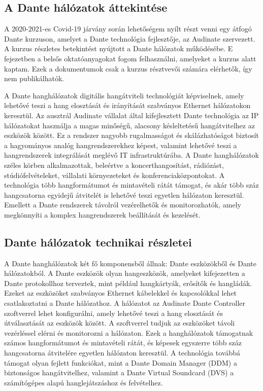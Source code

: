 \subsection{A Dante hálózatok áttekintése}

A 2020-2021-es Covid-19 járvány során lehetőségem nyílt részt venni egy átfogó Dante
kurzuson, amelyet a Dante technológia fejlesztője, az Audinate szervezett. A kurzus
részletes betekintést nyújtott a Dante hálózatok működésébe. E fejezetben a belsős
oktatóanyagokat fogom felhasználni, amelyeket a kurzus alatt kaptam. Ezek a dokumentumok
csak a kurzus résztvevői számára elérhetők, így nem publikálhatók.

A Dante hanghálózatok digitális hangátviteli technológiát képviselnek, amely lehetővé teszi
a hang elosztását és irányítását szabványos Ethernet hálózatokon keresztül. Az ausztrál
Audinate vállalat által kifejlesztett Dante technológia az IP hálózatokat használja a
magas minőségű, alacsony késleltetésű hangátvitelhez az eszközök között. Ez a rendszer
nagyobb rugalmasságot és skálázhatóságot biztosít a hagyományos analóg hangrendszerekhez
képest, valamint lehetővé teszi a hangrendszerek integrálását meglévő IT infrastruktúrába.
A Dante hanghálózatok széles körben alkalmazottak, beleértve a koncerthangosítást, rádiózást,
stúdiófelvételeket, vállalati környezeteket és konferenciaközpontokat. A technológia
több hangformátumot és mintavételi rátát támogat, és akár több száz hangcsatorna egyidejű
átvitelét is lehetővé teszi egyetlen hálózaton keresztül. Emellett a Dante rendszerek távolról
vezérelhetők és monitorozhatók, amely megkönnyíti a komplex hangrendszerek beállítását és
kezelését.


\subsection{Dante hálózatok technikai részletei}
A Dante hanghálózatok két fő komponensből állnak: Dante eszközökből
és Dante hálózatokból. A Dante eszközök olyan hangeszközök, amelyeket
kifejezetten a Dante protokollhoz terveztek, mint például hangkártyák, erősítők
és hangládák. Ezeket az eszközöket szabványos Ethernet kábelekkel és
kapcsolókkal lehet csatlakoztatni a Dante hálózathoz.
A hálózatot az Audinate Dante Controller szoftverrel lehet
konfigurálni, amely lehetővé teszi a hang elosztását és útválasztását az
eszközök között. A szoftverrel tudjuk az eszközöket távoli vezérléssel elérni és
monitorozni a hálózaton. Ezek a hanghálózatok támogatnak számos
hangformátumot és mintavételi rátát, és képesek egyszerre több száz hangcsatorna
átvitelére egyetlen hálózaton keresztül. A technológia továbbá támogat olyan
fejlett funkciókat, mint a Dante Domain Manager (DDM) a biztonságos
hangátvitelhez, valamint a Dante Virtual Soundcard (DVS) a számítógépes alapú
hanglejátszáshoz és felvételhez. 

